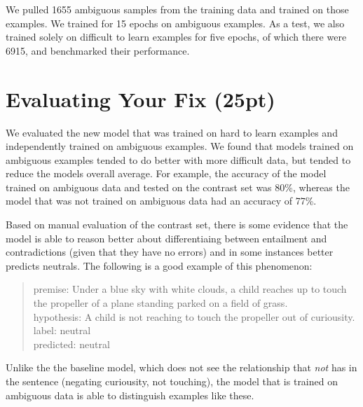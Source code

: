 \documentclass[twocolumn]{article}
\begin{document}
We pulled 1655 ambiguous samples from the training data and trained on those
examples. We trained for 15 epochs on ambiguous examples. As a test, we also
trained solely on difficult to learn examples for five epochs, of which there
were 6915, and benchmarked their performance.

\section{Evaluating Your Fix (25pt)}

We evaluated the new model that was trained on hard to learn examples and
independently trained on ambiguous examples. We found that models trained on
ambiguous examples tended to do better with more difficult data, but tended to
reduce the models overall average. For example, the accuracy of the model
trained on ambiguous data and tested on the contrast set was 80\%, whereas the
model that was not trained on ambiguous data had an accuracy of 77\%.

Based on manual evaluation of the contrast set, there is some evidence that the
model is able to reason better about differentiaing between entailment and
contradictions (given that they have no errors) and in some instances better
predicts neutrals. The following is a good example of this phenomenon:


\begin{quote}
premise: Under a blue sky with white clouds, a child reaches up to touch the propeller of a plane standing parked on a field of grass. \\
hypothesis: A child is not reaching to touch the propeller out of curiousity.  \\
label: neutral \\
predicted: neutral
\end{quote}

Unlike the the baseline model, which does not see the relationship that
\textit{not} has in the sentence (negating curiousity, not touching), the model
that is trained on ambiguous data is able to distinguish examples like these.
\end{document}
